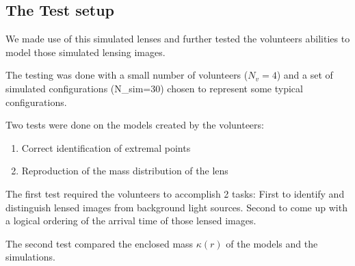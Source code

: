 \subsection{The Test setup} \label{sec:testsetup}
We made use of this simulated lenses and further tested the volunteers abilities to model those simulated lensing images.

The testing was done with a small number of volunteers ($N_v=4$) and a set of simulated configurations (N_{sim}=30) chosen to represent some typical configurations.

Two tests were done on the models created by the volunteers:

\begin{enumerate}
  \item Correct identification of extremal points
  \item Reproduction of the mass distribution of the lens
\end{enumerate}

The first test required the volunteers to accomplish 2 tasks: First to identify and distinguish lensed images from background light sources.
Second to come up with a logical ordering of the arrival time of those lensed images.

The second test compared the enclosed mass $\kappa(r)$ of the models and the simulations.



